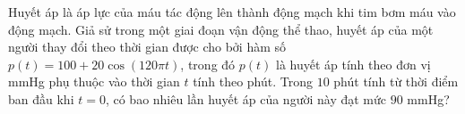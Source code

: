 \begin{ex}%
	Huyết áp là áp lực của máu tác động lên thành động mạch khi tim bơm máu vào động mạch. Giả sử trong một giai đoạn vận động thể thao, huyết áp của một người thay đổi theo thời gian được cho bởi hàm số $p(t) = 100 + 20 \cos(120\pi t)$, trong đó $p(t)$ là huyết áp tính theo đơn vị mmHg phụ thuộc vào thời gian $t$ tính theo phút. Trong $10$ phút tính từ thời điểm ban đầu khi $t = 0$, có bao nhiêu lần huyết áp của người này đạt mức $90$ mmHg?
\par{}
\end{ex}


